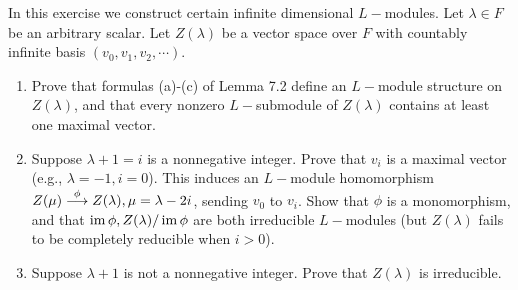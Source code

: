 \begin{ex}
  In this exercise we construct certain infinite dimensional $L-$modules. Let $\lambda\in F$ be an arbitrary scalar. Let $Z(\lambda)$ be a vector space over $F$ with countably infinite basis $(v_0, v_1, v_2, \cdots )$.
  \begin{enumerate}
    \item Prove that formulas (a)-(c) of Lemma 7.2 define an $L-$module structure on $Z(\lambda)$, and that every nonzero $L-$submodule of $Z(\lambda)$ contains at least one maximal vector.
    \item Suppose $\lambda + 1 = i$ is a nonnegative integer. Prove that $v_i$ is a maximal vector (e.g., $\lambda = -1, i = 0$). This induces an $L-$module homomorphism $Z(\mu)\stackrel{{\phi}}{\longrightarrow}Z(\lambda), \mu = \lambda - 2i$, sending $v_0$ to $v_i$. Show that $\phi$ is a monomorphism, and that $\operatorname{im}\phi, Z(\lambda)/\operatorname{im}\phi$ are both irreducible $L-$modules (but $Z(\lambda)$ fails to be completely reducible when $i > 0$).
    \item Suppose $\lambda + 1$ is not a nonnegative integer. Prove that $Z(\lambda)$ is irreducible.
  \end{enumerate}
\end{ex}
